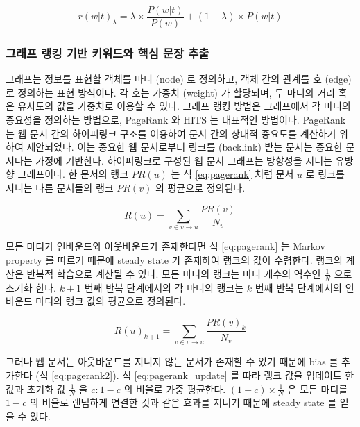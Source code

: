 \documentclass[11pt]{article}
\begin{document}
\begin{equation}
  \label{eq:ldavis}
  r(w \vert t)_\lambda = \lambda \times \frac{P(w \vert t)}{P(w)} + (1 - \lambda) \times P(w \vert t)
\end{equation}

\subsubsection{그래프 랭킹 기반 키워드와 핵심 문장 추출}

그래프는 정보를 표현할 객체를 마디 (node) 로 정의하고, 객체 간의 관계를 호 (edge) 로 정의하는 표현 방식이다.
각 호는 가중치 (weight) 가 할당되며, 두 마디의 거리 혹은 유사도의 값을 가중치로 이용할 수 있다.
그래프 랭킹 방법은 그래프에서 각 마디의 중요성을 정의하는 방법으로, PageRank \citep{ilprints422}와 HITS \citep{kleinberg1999authoritative} 는 대표적인 방법이다.
PageRank 는 웹 문서 간의 하이퍼링크 구조를 이용하여 문서 간의 상대적 중요도를 계산하기 위하여 제안되었다.
이는 중요한 웹 문서로부터 링크를 (backlink) 받는 문서는 중요한 문서다는 가정에 기반한다.
하이퍼링크로 구성된 웹 문서 그래프는 방향성을 지니는 유방향 그래프이다.
한 문서의 랭크 $PR(u)$ 는 식 \ref{eq:pagerank} 처럼 문서 $u$ 로 링크를 지니는 다른 문서들의 랭크 $PR(v)$ 의 평균으로 정의된다.

\begin{equation}
  \label{eq:pagerank}
  R(u) = \sum_{v \in v \rightarrow u} \frac{PR(v)}{N_v}
\end{equation}

모든 마디가 인바운드와 아웃바운드가 존재한다면 식 \ref{eq:pagerank} 는 Markov property 를 따르기 때문에 steady state 가 존재하여 랭크의 값이 수렴한다.
랭크의 계산은 반복적 학습으로 계산될 수 있다.
모든 마디의 랭크는 마디 개수의 역수인 $\frac{1}{N}$ 으로 초기화 한다.
$k+1$ 번째 반복 단계에서의 각 마디의 랭크는 $k$ 번째 반복 단계에서의 인바운드 마디의 랭크 값의 평균으로 정의된다.

\begin{equation}
  \label{eq:pagerank_update}
  R(u)_{k+1} = \sum_{v \in v \rightarrow u} \frac{PR(v)_k}{N_v}
\end{equation}

그러나 웹 문서는 아웃바운드를 지니지 않는 문서가 존재할 수 있기 때문에 bias 를 추가한다 (식 \ref{eq:pagerank2}).
식 \ref{eq:pagerank_update} 를 따라 랭크 값을 업데이트 한 값과 초기화 값 $\frac{1}{N}$ 을 $c : 1-c$ 의 비율로 가중 평균한다.
$(1-c) \times \frac{1}{N}$ 은 모든 마디를 $1-c$ 의 비율로 랜덤하게 연결한 것과 같은 효과를 지니기 때문에 steady state 를 얻을 수 있다.
\end{document}
